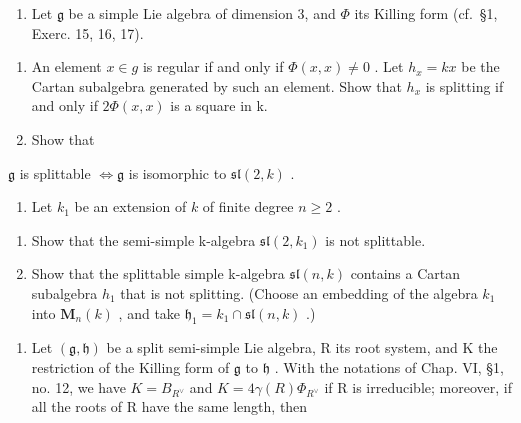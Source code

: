 
\begin{enumerate}
\def\labelenumi{\arabic{enumi})}
\tightlist
\item
  Let \(\mathfrak{g}\) be a simple Lie algebra of dimension 3, and \(\varPhi\) its Killing form (cf.~§1, Exerc. 15, 16, 17).
\end{enumerate}

\begin{enumerate}
\def\labelenumi{\alph{enumi})}
\item
  An element \(x \in g\) is regular if and only if \(\Phi(x, x) \neq 0\) . Let \(h_x = kx\) be the Cartan subalgebra generated by such an element. Show that \(h_x\) is splitting if and only if \(2\Phi(x, x)\) is a square in k.
\item
  Show that
\end{enumerate}

\(\mathfrak{g}\) is splittable \(\Longleftrightarrow \mathfrak{g}\) is isomorphic to \(\mathfrak{sl}(2,k)\) .

\begin{enumerate}
\def\labelenumi{\arabic{enumi})}
\setcounter{enumi}{1}
\tightlist
\item
  Let \(k_{1}\) be an extension of \(k\) of finite degree \(n \geq 2\) .
\end{enumerate}

\begin{enumerate}
\def\labelenumi{\alph{enumi})}
\item
  Show that the semi-simple k-algebra \(\mathfrak{sl}(2,k_{1})\) is not splittable.
\item
  Show that the splittable simple k-algebra \(\mathfrak{sl}(n,k)\) contains a Cartan subalgebra \(h_{1}\) that is not splitting. (Choose an embedding of the algebra \(k_{1}\) into \(\mathbf{M}_{n}(k)\) , and take \(\mathfrak{h}_{1}=k_{1}\cap\mathfrak{sl}(n,k)\) .)
\end{enumerate}

\begin{enumerate}
\def\labelenumi{\arabic{enumi})}
\setcounter{enumi}{2}
\tightlist
\item
  Let \((\mathfrak{g},\mathfrak{h})\) be a split semi-simple Lie algebra, R its root system, and K the restriction of the Killing form of \(\mathfrak{g}\) to \(\mathfrak{h}\) . With the notations of Chap. VI, §1, no. 12, we have \(K = B_{R^{\vee}}\) and \(K = 4\gamma(R)\varPhi_{R^{\vee}}\) if R is irreducible; moreover, if all the roots of R have the same length, then
\end{enumerate}

